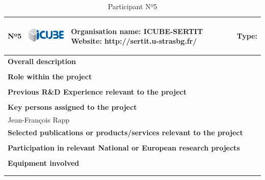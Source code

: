 \begin{longtable}[H]{|p{0.7cm}|p{4cm}|p{7cm}|p{1.3cm}|}
	\hline
	\begin{center} Nº5 \end{center} & \begin{center} \includegraphics[scale=0.6]{./logos/Icube_web} \end{center} & \begin{center} \textbf{Organisation name:} ICUBE-SERTIT \newline \textbf{Website:} http://sertit.u-strasbg.fr/ \end{center} & \begin{center} Type: \end{center} \\ \hline
	
	\multicolumn{4}{|p{13cm}|}{\textbf{Overall description}}  \\ \hline
	
	\multicolumn{4}{|p{13cm}|}{}  \\ \hline
	
	\multicolumn{4}{|p{13cm}|}{\textbf{Role within the project}}   \\ \hline
	
	\multicolumn{4}{|p{13cm}|}{}  \\ \hline
	
	\multicolumn{4}{|p{13cm}|}{\textbf{Previous R\&D Experience relevant to the project}}  \\ \hline
	
	\multicolumn{4}{|p{13cm}|}{}  \\ \hline
	
	\multicolumn{4}{|p{13cm}|}{\textbf{Key persons assigned to the project}}   \\ \hline
	
	\multicolumn{4}{|p{13cm}|}{Jean-François Rapp}  \\ \hline
	
	\multicolumn{4}{|p{13cm}|}{\textbf{Selected publications or products/services relevant to the project}}  \\ \hline
	
	\multicolumn{4}{|p{13cm}|}{}  \\ \hline
	
	\multicolumn{4}{|p{13cm}|}{\textbf{Participation in relevant National or European research projects}}  \\ \hline
	
	\multicolumn{4}{|p{13cm}|}{}  \\ \hline
	
	\multicolumn{4}{|p{13cm}|}{\textbf{Equipment involved}}  \\ \hline
	
	\multicolumn{4}{|p{13cm}|}{}  \\ \hline
	\caption{Participant Nº5}
\end{longtable}

